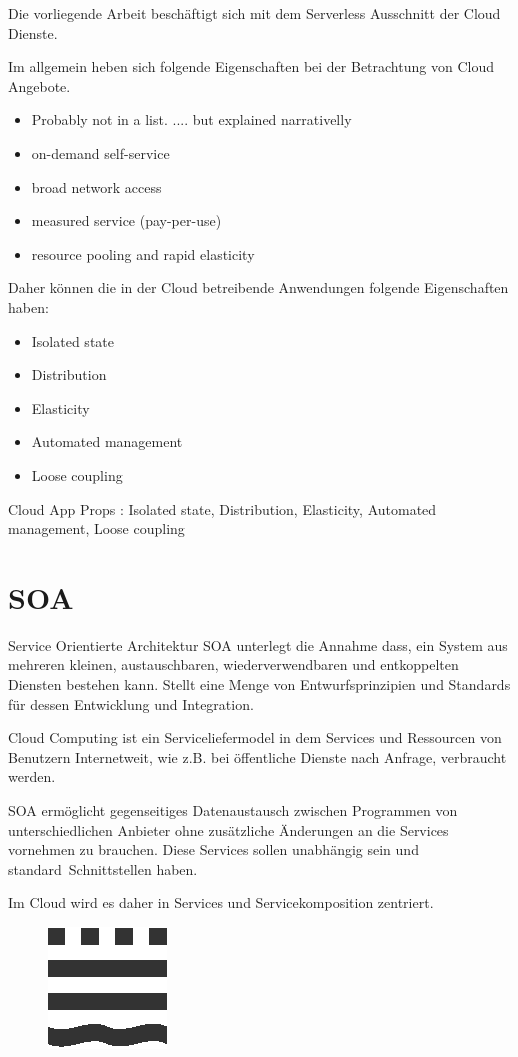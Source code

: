 \documentclass[
12pt,
english,
ngerman,
headsepline,
twoside,
openright,
numbers=noenddot,version=first
]{scrreprt}
\begin{document}
Die vorliegende Arbeit beschäftigt sich mit dem Serverless Ausschnitt der Cloud Dienste. 

Im allgemein heben sich folgende Eigenschaften bei der Betrachtung von Cloud Angebote.
\begin{itemize}
	\item Probably not in a list. .... but explained narrativelly
	\item on-demand self-service
	\item  broad network access
	\item  measured service (pay-per-use)
	\item resource pooling and rapid elasticity
\end{itemize}

Daher können die in der Cloud betreibende Anwendungen folgende Eigenschaften haben: 
\begin{itemize}
	\item Isolated state
	\item Distribution
	\item Elasticity
	\item Automated management
	\item Loose coupling
\end{itemize}

Cloud App Props : Isolated state, Distribution, Elasticity, Automated management, Loose coupling

\section{SOA}
\label{sec:soa}
Service Orientierte Architektur SOA unterlegt die Annahme dass, ein System aus mehreren kleinen, austauschbaren, wiederverwendbaren und entkoppelten Diensten bestehen kann. Stellt eine Menge von Entwurfsprinzipien und Standards für dessen Entwicklung und Integration\cite{cloudEssentials}.

Cloud Computing ist ein Serviceliefermodel in dem Services und Ressourcen von Benutzern Internetweit, wie z.B. bei öffentliche Dienste nach Anfrage, verbraucht werden.

SOA ermöglicht gegenseitiges Datenaustausch zwischen Programmen von unterschiedlichen Anbieter ohne zusätzliche Änderungen an die Services vornehmen zu brauchen. Diese Services sollen unabhängig sein und \glqq standard\grqq\ Schnittstellen haben. 

Im Cloud wird es daher in Services und Servicekomposition zentriert.

\begin{figure}
	\includegraphics[scale=0.5]{./pics/2015_10_05_THB_Logo_BW.eps}
\end{figure}
\end{document}
